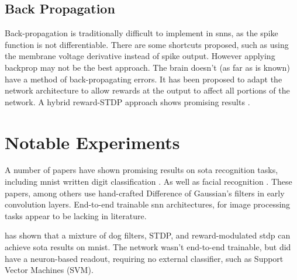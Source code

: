     \subsection{Back Propagation}
    
    Back-propagation is traditionally difficult to implement in \Glspl{snn}, as the
    spike function is not differentiable. There are some shortcuts proposed,
    such as using the membrane voltage derivative instead of spike
    output. However applying backprop may not be the best approach. The brain
    doesn't (as far as is known) have a method of back-propagating errors. It
    has been proposed to adapt the network architecture to allow rewards at the
    output to affect all portions of the network. A hybrid reward-STDP approach
    shows promising results \cite{tavanaei_2019}.
    
    
    \section{Notable Experiments}
    A number of papers have shown promising results on \acrfull{sota} recognition tasks,
    including \Gls{mnist} written digit classification \cite{mozafari_2018}. As well as
    facial recognition \cite{delorme_2001}. These papers, among others use
    hand-crafted Difference of Gaussian's filters in early convolution
    layers. End-to-end trainable \Gls{snn} architectures, for image processing tasks
    appear to be lacking in literature.
    
    \parencite{mozafari_2018} has shown that a mixture of \Gls{dog} filters, STDP, and
    reward-modulated \Gls{stdp} can achieve \acrshort{sota} results on \Gls{mnist}. The
    network wasn't end-to-end trainable, but did have a neuron-based readout,
    requiring no external classifier, such as Support Vector Machines (SVM).
    
